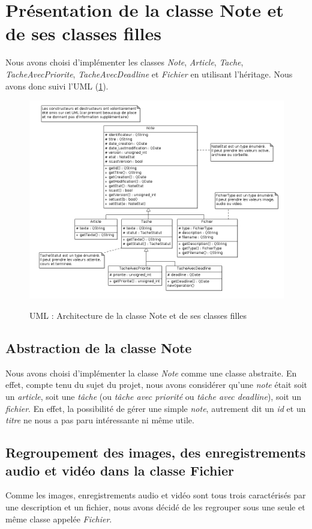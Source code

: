 \documentclass[a4paper,10pt]{report}
\begin{document}
\section{Présentation de la classe Note et de ses classes filles}
Nous avons choisi d'implémenter les classes \textit{Note}, \textit{Article}, \textit{Tache}, \textit{TacheAvecPriorite}, \textit{TacheAvecDeadline} et \textit{Fichier} en utilisant l'héritage. Nous avons donc suivi l'UML (\ref{UML_note}).
\begin{center}
\begin{figure}[H]
\caption{UML : Architecture de la classe Note et de ses classes filles}
\includegraphics[width=\textwidth]{UML_note.png}
\label{UML_note}
\end{figure}
\end{center}

\subsection{Abstraction de la classe Note}
Nous avons choisi d'implémenter la classe \textit{Note} comme une classe abstraite. En effet, compte tenu du sujet du projet, nous avons considérer qu'une \textit{note} était soit un \textit{article}, soit une \textit{tâche} (ou \textit{tâche avec priorité} ou \textit{tâche avec deadline}), soit un \textit{fichier}. En effet, la possibilité de gérer une simple \textit{note}, autrement dit un \textit{id} et un \textit{titre} ne nous a pas paru intéressante ni même utile.

\subsection{Regroupement des images, des enregistrements audio et vidéo dans la classe Fichier}
Comme les images, enregistrements audio et vidéo sont tous trois caractérisés par une description et un fichier, nous avons décidé de les regrouper sous une seule et même classe appelée \textit{Fichier}.
\end{document}
